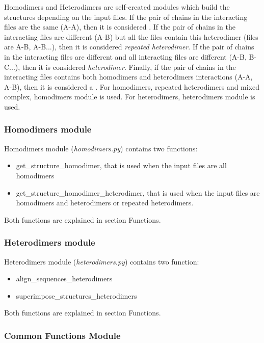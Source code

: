 \documentclass[a4paper,10pt]{report}
\begin{document}
Homodimers and Heterodimers are self-created modules which build the structures depending on the input files. If the pair of chains in the interacting files are the same (A-A), then it is considered . If the pair of chains in the interacting files are different (A-B) but all the files contain this heterodimer (files are A-B, A-B...), then it is considered \textit{repeated heterodimer}. If the pair of chains in the interacting files are different and all interacting files are different (A-B, B-C...), then it is considered \textit{heterodimer}. Finally, if the pair of chains in the interacting files contains both homodimers and heterodimers interactions (A-A, A-B), then it is considered a . For homodimers, repeated heterodimers and mixed complex, homodimers module is used. For heterodimers, heterodimers module is used.

\subsubsection{Homodimers module}

Homodimers module (\textit{homodimers.py}) contains two functions:

\begin{itemize}
 \item get\_structure\_homodimer, that is used when the input files are all homodimers
 \item get\_structure\_homodimer\_heterodimer, that is used when the input files are homodimers and heterodimers or repeated heterodimers.
\end{itemize}

\noindent
Both functions are explained in section Functions.

\subsubsection{Heterodimers module}

Heterodimers module (\textit{heterodimers.py}) contains two function:

\begin{itemize}
 \item align\_sequences\_heterodimers
 \item superimpose\_structures\_heterodimers
\end{itemize}

\noindent
Both functions are explained in section Functions.

\subsubsection{Common Functions Module}
\end{document}
